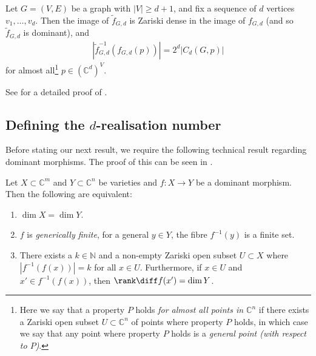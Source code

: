 \begin{lemma}\label{l:xgd}
	Let $G=(V,E)$ be a graph with $|V| \geq d+1$,
	and fix a sequence of $d$ vertices $v_1,\ldots, v_d$.
	Then the image of $\tilde{f}_{G,d}$ is Zariski dense in the image of $f_{G,d}$ (and so $\tilde{f}_{G,d}$ is dominant),
	and
	\begin{align*}
		\left|\tilde{f}_{G,d}^{-1}\left(f_{G,d}(p) \right) \right| = 2^{d} |C_d(G,p)|
	\end{align*}
	for almost all\footnote{Here we say that a property $P$ holds \emph{for almost all points in $\mathbb{C}^n$} if there exists a Zariski open subset $U \subset \mathbb{C}^n$ of points where property $P$ holds, in which case we say that any point where property $P$ holds is a \emph{general point (with respect to $P$)}.} $p \in (\mathbb{C}^d)^V$.
\end{lemma}

See  for a detailed proof of .




\subsection{Defining the \texorpdfstring{$d$-realisation}{d-realisation} number}

Before stating our next result, we require the following technical result regarding dominant morphisms.
The proof of this can be seen in .

\begin{theorem}\label{t:deg}
	Let $X \subset \mathbb{C}^m$ and $Y \subset \mathbb{C}^n$ be varieties and $f:X \rightarrow Y$ be a dominant morphism.
	Then the following are equivalent:
	\begin{enumerate}
		\item \label{t:deg1} $\dim X = \dim Y$.
		\item \label{t:deg2} $f$ is \emph{generically finite},
		\ie for a general $y \in Y$,
		the fibre $f^{-1}(y)$ is a finite set.
		\item \label{t:deg3} There exists a $k \in \mathbb{N}$ and a non-empty Zariski open subset $U \subset X$ where $|f^{-1}(f(x))| = k$ for all $x \in U$.
		Furthermore,
		if $x \in U$ and $x' \in f^{-1}(f(x))$,
		then $\rank \diff f(x') = \dim Y$.
	\end{enumerate}
\end{theorem}

